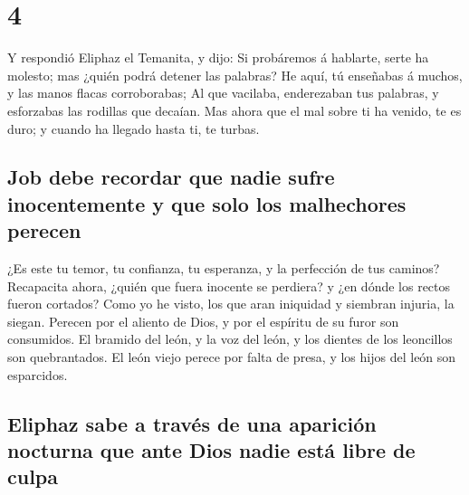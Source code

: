 \hypertarget{section-3}{%
\section{4}\label{section-3}}

 Y respondió Eliphaz el Temanita, y dijo: 
Si probáremos á hablarte, serte ha molesto; mas ¿quién podrá detener las
palabras?  He aquí, tú enseñabas á muchos, y las manos
flacas corroborabas;  Al que vacilaba, enderezaban tus
palabras, y esforzabas las rodillas que decaían.  Mas
ahora que el mal sobre ti ha venido, te es duro; y cuando ha llegado
hasta ti, te turbas.

\hypertarget{job-debe-recordar-que-nadie-sufre-inocentemente-y-que-solo-los-malhechores-perecen}{%
\subsection{Job debe recordar que nadie sufre inocentemente y que solo
los malhechores
perecen}\label{job-debe-recordar-que-nadie-sufre-inocentemente-y-que-solo-los-malhechores-perecen}}

 ¿Es este tu temor, tu confianza, tu esperanza, y la
perfección de tus caminos?  Recapacita ahora, ¿quién que
fuera inocente se perdiera? y ¿en dónde los rectos fueron cortados?
 Como yo he visto, los que aran iniquidad y siembran
injuria, la siegan.  Perecen por el aliento de Dios, y por
el espíritu de su furor son consumidos.  El bramido del
león, y la voz del león, y los dientes de los leoncillos son
quebrantados.  El león viejo perece por falta de presa, y
los hijos del león son esparcidos.

\hypertarget{eliphaz-sabe-a-travuxe9s-de-una-apariciuxf3n-nocturna-que-ante-dios-nadie-estuxe1-libre-de-culpa}{%
\subsection{Eliphaz sabe a través de una aparición nocturna que ante
Dios nadie está libre de
culpa}\label{eliphaz-sabe-a-travuxe9s-de-una-apariciuxf3n-nocturna-que-ante-dios-nadie-estuxe1-libre-de-culpa}}

